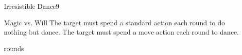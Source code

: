 \begin{spellsection}{Irresistible Dance}{9}
    \begin{spellheader}
    \end{spellheader}
    \begin{spellcontent}
        \begin{spelltargetinginfo}
        \end{spelltargetinginfo}
        \begin{spelleffects}
            \begin{spellattack}{Magic vs. Will}
                \spellsuccess The target must spend a standard action each round to do nothing but dance.
                \spellfailure The target must spend a move action each round to dance.
            \end{spellattack}
             rounds
        \end{spelleffects}
    \end{spellcontent}
    \begin{spellfooter}
        \miscastrandom
    \end{spellfooter}
\end{spellsection}


